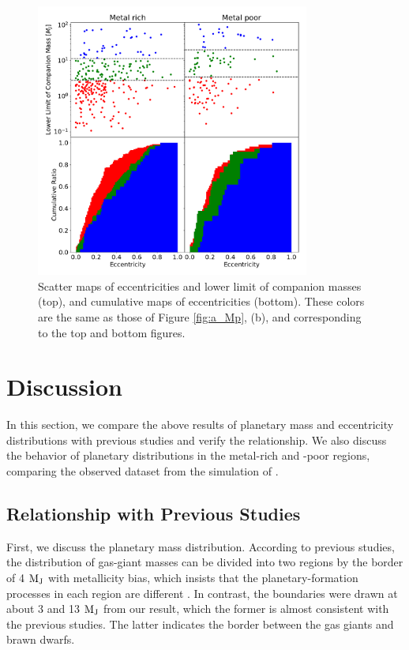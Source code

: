 \documentclass[twocolumn, dvipdfmx]{aastex62}
\begin{document}
\begin{CJK*}{UTF8}{min}
\begin{figure}[t]
\begin{center}
\includegraphics[width=9cm]{../../../Figure/e_Mp_merge.pdf}
\caption{Scatter maps of eccentricities and lower limit of companion masses (top), and cumulative maps of eccentricities (bottom). These colors are the same as those of Figure \ref{fig:a_Mp}, (b), and corresponding to the top and bottom figures. \label{fig:e_Mp}}
\end{center}
\end{figure}


\section{Discussion}

In this section, we compare the above results of planetary mass and eccentricity distributions with previous studies and verify the relationship. We also discuss the behavior of planetary distributions in the metal-rich and -poor regions, comparing the observed dataset from the simulation of \cite{2012A&A...541A..97M}.


\subsection{Relationship with Previous Studies}

First, we discuss the planetary mass distribution. According to previous studies, the distribution of gas-giant masses can be divided into two regions by the border of 4 $\rm M_J$ with metallicity bias, which insists that the planetary-formation processes in each region are different \citep[e.g.,][]{2017A&A...603A..30S}. In contrast, the boundaries were drawn at about 3 and 13 $\rm M_J$ from our result, which the former is almost consistent with the previous studies. The latter indicates the border between the gas giants and brawn dwarfs.


\end{CJK*}
\end{document}
